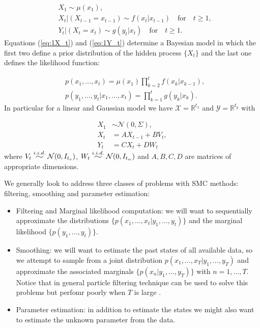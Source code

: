 \documentclass[11pt,a4paper]{article}
\newcommand{\widesim}[2][1.5]{
  \mathrel{\overset{#2}{\scalebox{#1}[1]{$\sim$}}}
}
\begin{document}
\begin{align}
    & X_1 \sim \mu(x_1), \nonumber \\
    & X_t | (X_{t-1} = x_{t-1}) \sim f(x_t | x_{t-1}) \quad \text{for} \quad t\geq 1, \label{eq:1X_t} \\ 
    & Y_t | (X_t = x_t) \sim g(y_t | x_t) \quad \text{for} \quad t\geq 1. \label{eq:1Y_t}
\end{align}
Equations (\ref{eq:1X_t}) and (\ref{eq:1Y_t}) determine a Bayesian model in which the first two define a prior distribution of the hidden process $\{ X_t \}$ and the last one defines the likelihood function:

\begin{align*}
    & p(x_1, \dots, x_t) = \mu(x_1) \prod_{k=2}^t f(x_k | x_{k-1}), \\
    & p(y_1, \dots, y_t | x_1, \dots, x_t) = \prod_{k=1}^t g(y_k | x_k).
\end{align*}
In particular for a linear and Gaussian model we have $\mathcal{X} = \mathbb{R}^{t_x}$ and $\mathcal{Y} = \mathbb{R}^{t_y}$ with

\begin{align*}
    X_1 &\sim \mathcal{N}(0, \Sigma),\\
    X_t & = A X_{t-1} + B V_t, \\
    Y_t & = C X_t + D W_t
\end{align*}
where $V_t \widesim{i.i.d.} \mathcal{N}(0, I_{t_v})$, $W_t \widesim{i.i.d.} \mathcal{N}(0, I_{t_w})$ and $A, B, C, D$ are matrices of appropriate dimensions. 

We generally look to address three classes of problems with SMC methods: filtering, smoothing and parameter estimation:

\begin{itemize}
    \item Filtering and Marginal likelihood computation: we will want to sequentially approximate the distributions $\{ p(x_1, \dots, x_t | y_1, \dots, y_t) \}$ and the marginal likelihood $\{ p(y_1, \dots, y_t) \}$.
    \item Smoothing: we will want to estimate the past states of all available data, so we attempt to sample from a joint distribution $p(x_1, \dots, x_T | y_1, \dots, y_T)$ and approximate the associated marginals $\{ p(x_n | y_1, \dots, y_T)\}$ with $n = 1, \dots, T$. Notice that in general particle filtering technique can be used to solve this problems but perfomr poorly when $T$ is large \cite{DoucetTutorial}.
    \item Parameter estimation: in addition to estimate the states we might also want to estimate the unknown parameter from the data.
\end{itemize}
\end{document}

